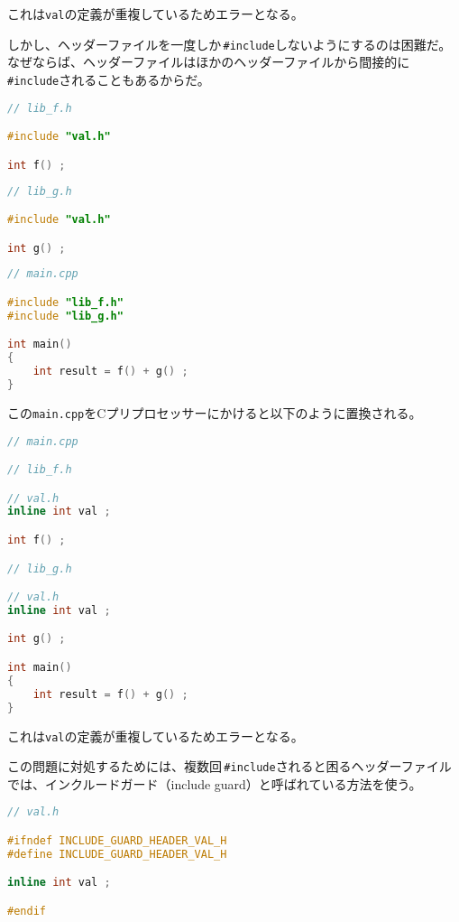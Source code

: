 これは\texttt{val}の定義が重複しているためエラーとなる。

しかし、ヘッダーファイルを一度しか\,\texttt{\#include}しないようにするのは困難だ。なぜならば、ヘッダーファイルはほかのヘッダーファイルから間接的に\,\texttt{\#include}されることもあるからだ。

\begin{lstlisting}[language={C++}]
// lib_f.h

#include "val.h"

int f() ;
\end{lstlisting}

\begin{lstlisting}[language={C++}]
// lib_g.h

#include "val.h"

int g() ;
\end{lstlisting}

\begin{lstlisting}[language={C++}]
// main.cpp

#include "lib_f.h"
#include "lib_g.h"

int main()
{
    int result = f() + g() ;
}
\end{lstlisting}

この\texttt{main.cpp}をCプリプロセッサーにかけると以下のように置換される。

\begin{lstlisting}[language={C++}]
// main.cpp

// lib_f.h

// val.h
inline int val ;

int f() ;

// lib_g.h

// val.h
inline int val ;

int g() ;

int main()
{
    int result = f() + g() ;
}
\end{lstlisting}

これは\texttt{val}の定義が重複しているためエラーとなる。

この問題に対処するためには、複数回\,\texttt{\#include}されると困るヘッダーファイルでは、インクルードガード（include guard）と呼ばれている方法を使う。

\begin{lstlisting}[language={C++}]
// val.h

#ifndef INCLUDE_GUARD_HEADER_VAL_H
#define INCLUDE_GUARD_HEADER_VAL_H

inline int val ;

#endif
\end{lstlisting}

